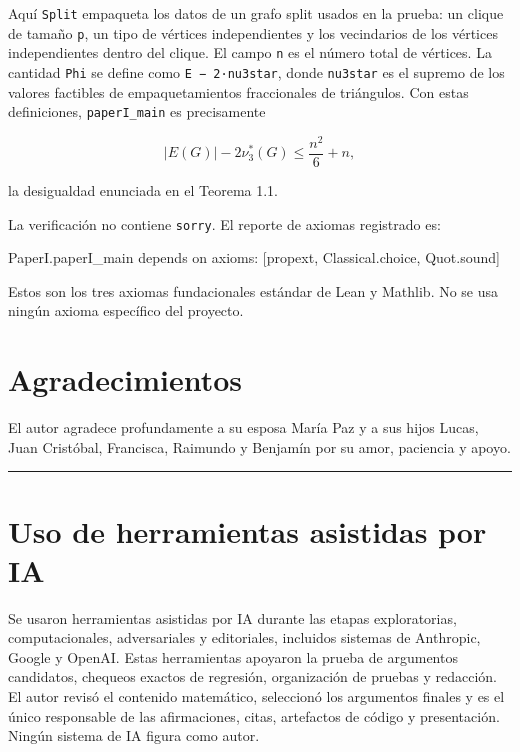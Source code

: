 \documentclass[
  11pt,
]{article}
\newenvironment{Shaded}{}{}
\newcommand{\NormalTok}[1]{#1}
\begin{document}
Aquí \texttt{Split} empaqueta los datos de un grafo split usados en la
prueba: un clique de tamaño \texttt{p}, un tipo de vértices
independientes y los vecindarios de los vértices independientes dentro
del clique. El campo \texttt{n} es el número total de vértices. La
cantidad \texttt{Phi} se define como
\texttt{\textbar{}E\textbar{}\ −\ 2·nu3star}, donde \texttt{nu3star} es
el supremo de los valores factibles de empaquetamientos fraccionales de
triángulos. Con estas definiciones, \texttt{paperI\_main} es
precisamente

\[
|E(G)|-2\nu_3^*(G)\le \frac{n^2}{6}+n,
\]

la desigualdad enunciada en el Teorema 1.1.

La verificación no contiene \texttt{sorry}. El reporte de axiomas
registrado es:

\begin{Shaded}
\begin{Highlighting}[]
\NormalTok{PaperI.paperI\_main depends on axioms: [propext, Classical.choice, Quot.sound]}
\end{Highlighting}
\end{Shaded}

Estos son los tres axiomas fundacionales estándar de Lean y Mathlib. No
se usa ningún axioma específico del proyecto.

\section{Agradecimientos}\label{agradecimientos}

El autor agradece profundamente a su esposa María Paz y a sus hijos
Lucas, Juan Cristóbal, Francisca, Raimundo y Benjamín por su amor,
paciencia y apoyo.

\begin{center}\rule{0.5\linewidth}{0.5pt}\end{center}

\section{Uso de herramientas asistidas por
IA}\label{uso-de-herramientas-asistidas-por-ia}

Se usaron herramientas asistidas por IA durante las etapas
exploratorias, computacionales, adversariales y editoriales, incluidos
sistemas de Anthropic, Google y OpenAI. Estas herramientas apoyaron la
prueba de argumentos candidatos, chequeos exactos de regresión,
organización de pruebas y redacción. El autor revisó el contenido
matemático, seleccionó los argumentos finales y es el único responsable
de las afirmaciones, citas, artefactos de código y presentación. Ningún
sistema de IA figura como autor.
\end{document}
